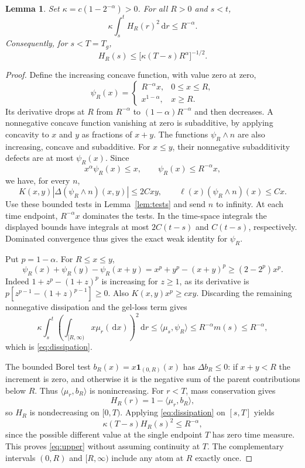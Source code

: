 \documentclass[11pt]{article}
\newtheorem{lemma}[theorem]{Lemma}
\newcommand{\pair}[2]{\langle #1,#2\rangle}
\newcommand{\ind}{\mathbf{1}}
\newcommand{\dd}{\,\mathrm{d}}
\begin{document}
\begin{lemma}\label{lem:concave}
Set $\kappa=c(1-2^{-\alpha})>0$. For all $R>0$ and $s<t$,
\begin{equation}\label{eq:dissipation}
 \kappa\int_s^t H_R(r)^2\dd r\le R^{-\alpha}.
\end{equation}
Consequently, for $s<T=T_g$,
\begin{equation}\label{eq:upper}
 H_R(s)\le\bigl[\kappa(T-s)R^\alpha\bigr]^{-1/2}.
\end{equation}
\end{lemma}
\begin{proof}
Define the increasing concave function, with value zero at zero,
\[
 \psi_R(x)=
 \begin{cases}R^{-\alpha}x,&0\le x\le R,\\
 x^{1-\alpha},&x\ge R.
 \end{cases}
\]
Its derivative drops at $R$ from $R^{-\alpha}$ to $(1-\alpha)R^{-\alpha}$ and then decreases. A nonnegative concave function vanishing at zero is subadditive, by applying concavity to $x$ and $y$ as fractions of $x+y$. The functions $\psi_R\wedge n$ are also increasing, concave and subadditive. For $x\le y$, their nonnegative subadditivity defects are at most $\psi_R(x)$. Since
\[
 x^\alpha\psi_R(x)\le x,\qquad \psi_R(x)\le R^{-\alpha}x,
\]
we have, for every $n$,
\[
 K(x,y)|\Delta(\psi_R\wedge n)(x,y)|\le2Cxy,
 \qquad \ell(x)(\psi_R\wedge n)(x)\le Cx.
\]
Use these bounded tests in Lemma~\ref{lem:tests} and send $n$ to infinity. At each time endpoint, $R^{-\alpha}x$ dominates the tests. In the time-space integrals the displayed bounds have integrals at most $2C(t-s)$ and $C(t-s)$, respectively. Dominated convergence thus gives the exact weak identity for $\psi_R$.

Put $p=1-\alpha$. For $R\le x\le y$,
\[
 \psi_R(x)+\psi_R(y)-\psi_R(x+y)
 =x^p+y^p-(x+y)^p\ge(2-2^p)x^p.
\]
Indeed $1+z^p-(1+z)^p$ is increasing for $z\ge1$, as its derivative is $p[z^{p-1}-(1+z)^{p-1}]\ge0$. Also $K(x,y)x^p\ge cxy$. Discarding the remaining nonnegative dissipation and the gel-loss term gives
\[
 \kappa\int_s^t\left(\int_{[R,\infty)}x\mu_r(\dd x)\right)^2\dd r
 \le\pair{\mu_s}{\psi_R}\le R^{-\alpha}m(s)\le R^{-\alpha},
\]
which is \eqref{eq:dissipation}.

The bounded Borel test $b_R(x)=x\ind_{(0,R)}(x)$ has $\Delta b_R\le0$: if $x+y<R$ the increment is zero, and otherwise it is the negative sum of the parent contributions below $R$. Thus $\pair{\mu_r}{b_R}$ is nonincreasing. For $r<T$, mass conservation gives
\[
 H_R(r)=1-\pair{\mu_r}{b_R},
\]
so $H_R$ is nondecreasing on $[0,T)$. Applying \eqref{eq:dissipation} on $[s,T]$ yields
\[
 \kappa(T-s)H_R(s)^2\le R^{-\alpha},
\]
since the possible different value at the single endpoint $T$ has zero time measure. This proves \eqref{eq:upper} without assuming continuity at $T$. The complementary intervals $(0,R)$ and $[R,\infty)$ include any atom at $R$ exactly once.
\end{proof}
\end{document}
